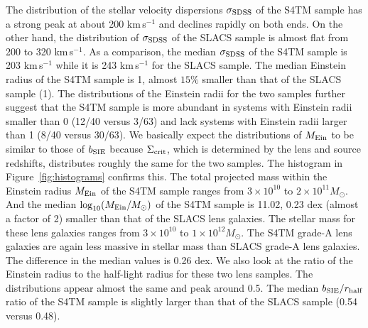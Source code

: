 \documentclass{emulateapj}
\begin{document}
The distribution of the stellar velocity dispersions 
$\sigma_{\rm SDSS}$ of the S4TM sample has a strong peak at about 200 km\,s$^{-1}$ and 
declines rapidly on both ends. On the other hand, the distribution of $\sigma_{\rm SDSS}$ 
of the SLACS sample is almost flat from 200 to 320 km\,s$^{-1}$. 
As a comparison, the median $\sigma_{\rm SDSS}$ of the S4TM sample is 203 km\,s$^{-1}$ while 
it is 243 km\,s$^{-1}$ for the SLACS sample. 
The median Einstein radius of the S4TM sample is 1, 
almost $15\%$ smaller than that of the SLACS sample (1). 
The distributions of the Einstein radii for the two samples further suggest that 
the S4TM sample is more abundant in systems with Einstein radii smaller than 0 
(12/40 versus 3/63) and lack systems with Einstein radii larger than 1 
(8/40 versus 30/63). 
We basically expect the distributions of $M_{\rm Ein}$ to be similar to those of $b_{\rm SIE}$ 
because $\Sigma_{\rm crit}$, which is determined by the lens and source redshifts, 
distributes roughly the same for the two samples. The histogram in Figure~\ref{fig:histograms} 
confirms this. The total projected mass within the Einstein radius $M_{\rm Ein}$ of the S4TM 
sample ranges from $3 \times 10^{10}$ to $2 \times 10^{11} M_{\odot}$. 
And the median $\log_{10} (M_{\rm Ein}/M_{\odot})$ of the S4TM sample is 11.02, 
0.23 dex (almost a factor of 2) smaller than that of the SLACS lens galaxies. 
The stellar mass for these lens galaxies ranges from $3\times10^{10}$ to 
$1\times10^{12} M_{\odot}$. 
The S4TM grade-A lens galaxies are again less massive in stellar mass than 
SLACS grade-A lens galaxies. The difference in the median values is 0.26 dex. 
We also look at the ratio of the Einstein radius to the half-light radius for these two lens 
samples. The distributions appear almost the same and peak around 0.5. The median 
$b_{\rm SIE}/r_{\rm half}$ ratio of the S4TM sample is slightly larger than that of the 
SLACS sample (0.54 versus 0.48). 

\begin{figure*}
\centering
{}
\caption{\label{fig:histograms}
Distributions of the stellar velocity dispersion, Einstein radius, 
total enclosed mass within the Einstein radius, and stellar mass for the S4TM 
(solid histograms) and the SLACS (dashed histograms) lens samples. The stellar mass is 
derived from \textsl{HST} F814W-band photometry assuming a Chabrier IMF as explained 
in \citet{Shu15}.}
\end{figure*}
\end{document}
